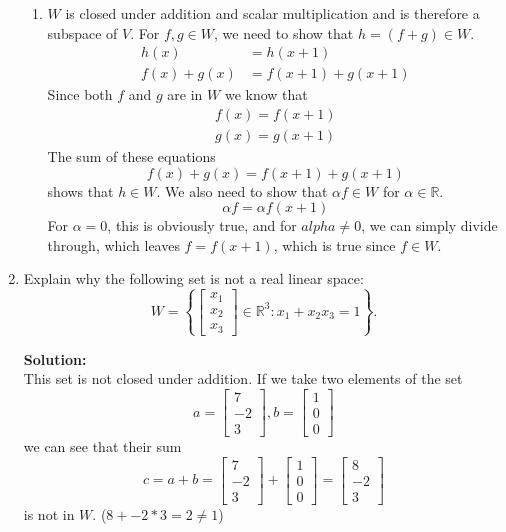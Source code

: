 \documentclass[]{article}
\newcommand{\R}{\mathbb{R}}
\newcommand{\bbm}{\begin{bmatrix}}
\newcommand{\ebm}{\end{bmatrix}}
\newcommand{\x}{\bm{x}}
\newcommand{\solution}{\vskip 0.5cm \textbf{\large Solution:} \\}
\begin{document}
\begin{enumerate}[resume]
\begin{enumerate}
	  \item $W$ is closed under addition and scalar multiplication and
        is therefore a subspace of $V$. For $f,g \in W$, we need to
        show that $h = (f + g) \in W$.
        \[ \begin{split}
          h(x) &= h(x + 1) \\
          f(x) + g(x) &= f(x + 1) + g(x + 1)
        \end{split} \]
        Since both $f$ and $g$ are in $W$ we know that
        \begin{gather*}
          f(x) = f(x + 1) \\
          g(x) = g(x + 1)
        \end{gather*}
        The sum of these equations
        \[
        f(x) + g(x) = f(x + 1) + g(x + 1)
        \]        
        shows that $h \in W$.  We also need to show that $\alpha f \in
        W$ for $\alpha \in \R$.
        \[
        \alpha f = \alpha f(x + 1)
        \]
        For $\alpha = 0$, this is obviously true, and for $alpha \neq
        0$, we can simply divide through, which leaves $f =
        f(x + 1)$, which is true since $f \in W$.
        
        
	  \end{enumerate}

	\item Explain why the following set is not a real linear space:
	  \[
	  W=\left\{\bbm x_1\\x_2\\x_3 \ebm\in\R^3 : x_1+x_2x_3=1\right\}.
	  \]
	  
	  \solution
      This set is not closed under addition. If we take two elements of the set
      \[
      a = \bbm 7 \\ -2 \\ 3 \ebm, b = \bbm 1  \\ 0 \\ 0 \ebm
      \]
      we can see that their sum
      \[
      c = a + b = \bbm 7 \\ -2 \\ 3 \ebm + \bbm 1  \\ 0 \\ 0 \ebm = \bbm 8 \\ -2 \\ 3 \ebm
      \]
      is not in $W$. ($8 + -2*3 = 2 \neq 1$)
    \end{enumerate}
\end{document}
